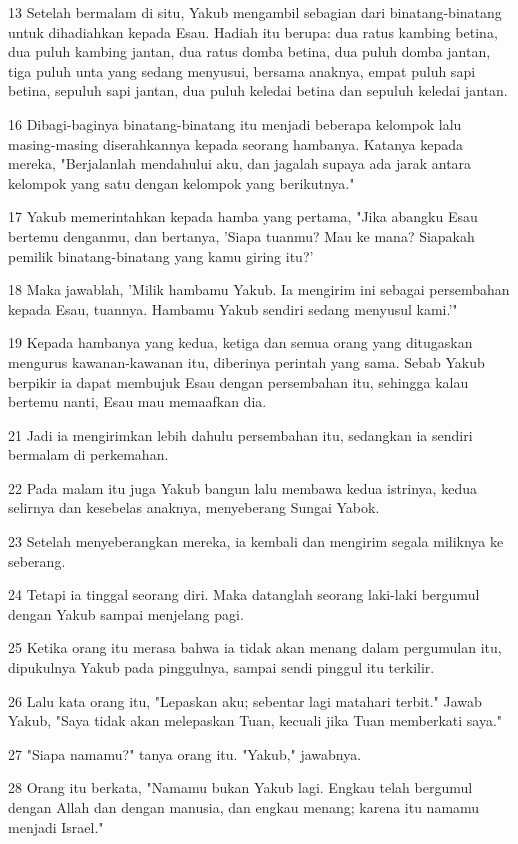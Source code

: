 \par 13 Setelah bermalam di situ, Yakub mengambil sebagian dari binatang-binatang untuk dihadiahkan kepada Esau. Hadiah itu berupa: dua ratus kambing betina, dua puluh kambing jantan, dua ratus domba betina, dua puluh domba jantan, tiga puluh unta yang sedang menyusui, bersama anaknya, empat puluh sapi betina, sepuluh sapi jantan, dua puluh keledai betina dan sepuluh keledai jantan.
\par 16 Dibagi-baginya binatang-binatang itu menjadi beberapa kelompok lalu masing-masing diserahkannya kepada seorang hambanya. Katanya kepada mereka, "Berjalanlah mendahului aku, dan jagalah supaya ada jarak antara kelompok yang satu dengan kelompok yang berikutnya."
\par 17 Yakub memerintahkan kepada hamba yang pertama, "Jika abangku Esau bertemu denganmu, dan bertanya, 'Siapa tuanmu? Mau ke mana? Siapakah pemilik binatang-binatang yang kamu giring itu?'
\par 18 Maka jawablah, 'Milik hambamu Yakub. Ia mengirim ini sebagai persembahan kepada Esau, tuannya. Hambamu Yakub sendiri sedang menyusul kami.'"
\par 19 Kepada hambanya yang kedua, ketiga dan semua orang yang ditugaskan mengurus kawanan-kawanan itu, diberinya perintah yang sama. Sebab Yakub berpikir ia dapat membujuk Esau dengan persembahan itu, sehingga kalau bertemu nanti, Esau mau memaafkan dia.
\par 21 Jadi ia mengirimkan lebih dahulu persembahan itu, sedangkan ia sendiri bermalam di perkemahan.
\par 22 Pada malam itu juga Yakub bangun lalu membawa kedua istrinya, kedua selirnya dan kesebelas anaknya, menyeberang Sungai Yabok.
\par 23 Setelah menyeberangkan mereka, ia kembali dan mengirim segala miliknya ke seberang.
\par 24 Tetapi ia tinggal seorang diri. Maka datanglah seorang laki-laki bergumul dengan Yakub sampai menjelang pagi.
\par 25 Ketika orang itu merasa bahwa ia tidak akan menang dalam pergumulan itu, dipukulnya Yakub pada pinggulnya, sampai sendi pinggul itu terkilir.
\par 26 Lalu kata orang itu, "Lepaskan aku; sebentar lagi matahari terbit." Jawab Yakub, "Saya tidak akan melepaskan Tuan, kecuali jika Tuan memberkati saya."
\par 27 "Siapa namamu?" tanya orang itu. "Yakub," jawabnya.
\par 28 Orang itu berkata, "Namamu bukan Yakub lagi. Engkau telah bergumul dengan Allah dan dengan manusia, dan engkau menang; karena itu namamu menjadi Israel."
